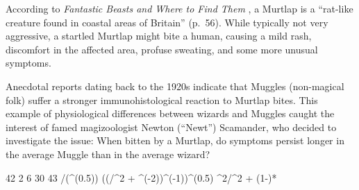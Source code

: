 \label{ex:muggle}
According to \textit{Fantastic Beasts and Where to Find Them} \cite{scamander2001fantastic}, a Murtlap is a ``rat-like creature found in coastal areas of Britain'' (p.~56).  While typically not very aggressive, a startled Murtlap might bite a human, causing a mild rash, discomfort in the affected area,  profuse sweating, and some more unusual symptoms.

Anecdotal reports dating back to the 1920s indicate that Muggles (non-magical folk) suffer a stronger immunohistological reaction to Murtlap bites.  This example of physiological differences between wizards and Muggles caught the interest of famed magizoologist Newton (``Newt'') Scamander, who decided to investigate the issue: When bitten by a Murtlap, do symptoms persist longer in the average Muggle than in the average wizard?

\newcommand{\units}{hours}
\FPset{\vmw}    {42}   %
\FPset{\vsigma} { 2}   %
\FPset{\va}     {\vmw} %
\FPset{\vb}     { 6}   %
\FPset{\vn}     {30}   %
\FPset{\vxbar}  {43}   %
\FPeval{\vs}    {\vsigma/(\vn^(0.5))}  %
\FPeval{\vbhat} {((\vn/\vsigma^2 + \vb^(-2))^(-1))^(0.5)}  %
\FPeval{\vW}    {\vbhat^2/\vb^2}  %
\FPeval{\vahat} {\vW*\va + (1-\vW)*\vxbar}  %


\FPexp{\pdfinvkernel}{\pdferr}                              %
\FPeval{\vbf}{\vb/(\vbhat * \pdfinvkernel)}                 %
\FPeval{\ibf}{(\vbhat * \pdfinvkernel)/\vb}                 %

